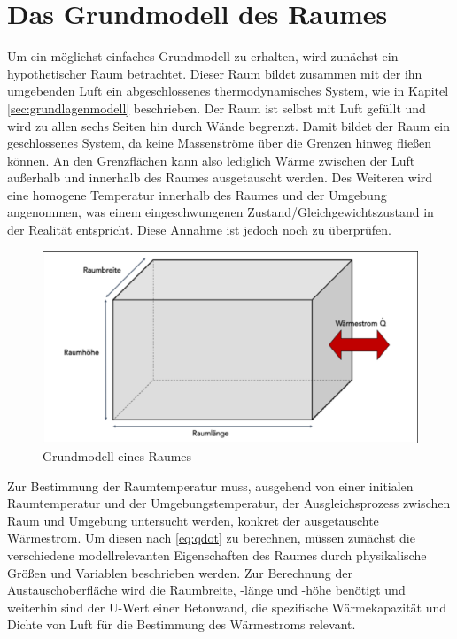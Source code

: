 \section{Das Grundmodell des Raumes}

Um ein möglichst einfaches Grundmodell zu erhalten, wird zunächst ein hypothetischer Raum betrachtet. Dieser Raum bildet zusammen mit der ihn umgebenden Luft ein abgeschlossenes thermodynamisches System, wie in Kapitel \ref{sec:grundlagenmodell} beschrieben. Der Raum ist selbst mit Luft gefüllt und wird zu allen sechs Seiten hin durch Wände begrenzt. Damit bildet der Raum ein geschlossenes System, da keine Massenströme über die Grenzen hinweg fließen können. An den Grenzflächen kann also lediglich Wärme zwischen der Luft außerhalb und innerhalb des Raumes ausgetauscht werden. Des Weiteren wird eine homogene Temperatur innerhalb des Raumes und der Umgebung angenommen, was einem eingeschwungenen Zustand/Gleichgewichtszustand in der Realität entspricht. Diese Annahme ist jedoch noch zu überprüfen.

\begin{figure}
\centering
\includegraphics[width=\textwidth]{abbildungen/20160316_grundraum}
\caption{Grundmodell eines Raumes}
\label{fig:grundraum}
\end{figure}

Zur Bestimmung der Raumtemperatur muss, ausgehend von einer initialen Raumtemperatur und der Umgebungstemperatur, der Ausgleichsprozess zwischen Raum und Umgebung untersucht werden, konkret der ausgetauschte Wärmestrom. Um diesen nach \ref{eq:qdot} zu berechnen, müssen zunächst die verschiedene modellrelevanten Eigenschaften des Raumes durch physikalische Größen und Variablen beschrieben werden. Zur Berechnung der Austauschoberfläche wird die Raumbreite, -länge und -höhe benötigt und weiterhin sind der U-Wert einer Betonwand, die spezifische Wärmekapazität und Dichte von Luft für die Bestimmung des Wärmestroms relevant.

